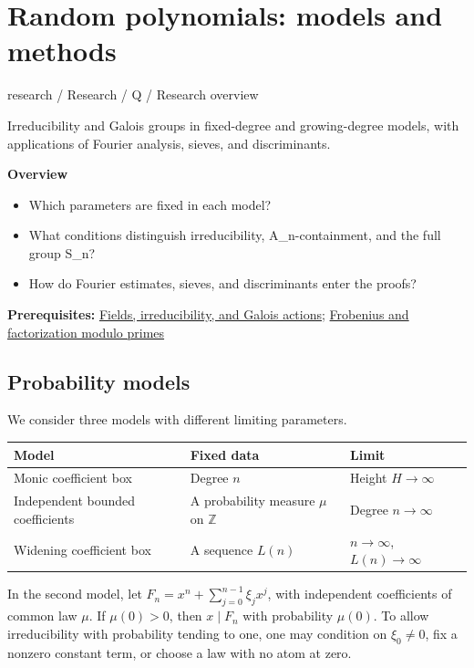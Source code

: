 \documentclass[11pt,a4paper,oneside,openany]{book}
\begin{document}
\chapter{Random polynomials: models and methods}\label{article:random-models}\hypertarget{article:random-models}{}\color{black}
{\sffamily\small\color{atlasgold}research / Research / Q / Research overview}\par\medskip
Irreducibility and Galois groups in fixed-degree and growing-degree models, with applications of Fourier analysis, sieves, and discriminants.\par\medskip
\textbf{Overview}\begin{itemize}
\item Which parameters are fixed in each model?
\item What conditions distinguish irreducibility, A\_\allowbreak{}n-containment, and the full group S\_\allowbreak{}n?
\item How do Fourier estimates, sieves, and discriminants enter the proofs?
\end{itemize}
{\small\textbf{Prerequisites:} \hyperlink{article:foundations}{Fields, irreducibility, and Galois actions}; \hyperlink{article:frobenius}{Frobenius and factorization modulo primes}}\par
{}\section{Probability models}
\color{black} We consider three models with different limiting parameters.\par
\begin{center}\small\begin{tabularx}{\linewidth}{@{}>{\raggedright\arraybackslash}X>{\raggedright\arraybackslash}X>{\raggedright\arraybackslash}X@{}}\toprule
\textbf{Model} & \textbf{Fixed data} & \textbf{Limit} \\
\midrule
Monic coefficient box & Degree \(n\) & Height \(H\to\infty\) \\
Independent bounded coefficients & A probability measure \(\mu\) on \(\mathbb Z\) & Degree \(n\to\infty\) \\
Widening coefficient box & A sequence \(L(n)\) & \(n\to\infty\), \(L(n)\to\infty\) \\
\bottomrule\end{tabularx}\end{center}
\color{black} In the second model, let \(F_n=x^n+\sum_{j=0}^{n-1}\xi_jx^j\), with independent coefficients of common law \(\mu\). If \(\mu(0)>0\), then \(x\mid F_n\) with probability \(\mu(0)\). To allow irreducibility with probability tending to one, one may condition on \(\xi_0\ne0\), fix a nonzero constant term, or choose a law with no atom at zero.\par
\end{document}
